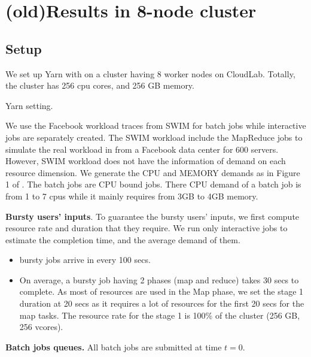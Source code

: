 \section{{(old)Results in 8-node cluster}}
\subsection{Setup}

We set up Yarn with \name on a cluster having 8 worker nodes on CloudLab. Totally, the cluster has 256 cpu cores, and 256 GB memory.

Yarn setting. 

We use the Facebook workload traces from SWIM \cite{SWIM} for batch jobs while interactive jobs are separately created. The SWIM workload include the MapReduce jobs to simulate the real workload in from a Facebook data center for 600 servers. However, SWIM workload does not have the information of demand on each resource dimension.  We generate the CPU and MEMORY demands as in Figure 1 of \cite{drf}. The batch jobs are CPU bound jobs. There CPU demand of a batch job is from 1 to 7 cpus while it mainly requires from 3GB to 4GB memory. 



\textbf{Bursty users' inputs}. To guarantee the bursty users' inputs, we first compute resource rate and duration that they require. We run only interactive jobs to estimate the completion time, and the average demand of them.
\begin{itemize}
	\item bursty jobs arrive in every 100 secs.
	\item On average, a bursty job having 2 phases (map and reduce) takes 30 secs to complete. As most of resources are used in the Map phase, we set the stage 1 duration at 20 secs as it requires a lot of resources for the first 20 secs for the map tasks. The resource rate for the stage 1 is 100\% of the cluster (256 GB, 256 vcores).
\end{itemize}

\textbf{Batch jobs queues.} All batch jobs are submitted at time $t=0$.

